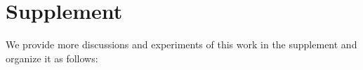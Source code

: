 \documentclass[sigconf]{acmart}
\begin{document}






\newpage
\appendix
\onecolumn
\setcounter{page}{1}


\section*{Supplement}

We provide more discussions and experiments of this work in the supplement and organize it as follows:
\end{document}
